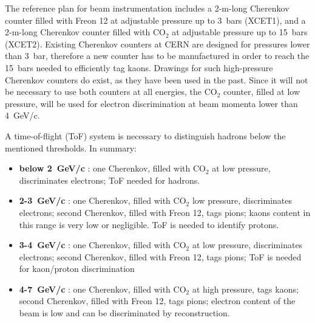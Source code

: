 The reference plan for beam instrumentation includes a 2-m-long
Cherenkov  counter filled with Freon 12 at adjustable pressure up to
3~bars (XCET1), and a  2-m-long  
 Cherenkov  counter filled with CO$_2$ at adjustable pressure up to
 15~bars (XCET2).
Existing Cherenkov counters at CERN are designed for pressures lower than  3~bar, therefore a new counter has to be manufactured in order to reach the 15~bars needed to efficiently tag kaons. Drawings for such high-pressure Cherenkov counters do exist, as they have been %
used in the past. 
Since it will not be necessary to use both counters at all energies, the CO$_2$
counter, filled at low pressure,  will be used for electron discrimination at beam momenta lower
than 4~GeV/c.  

A time-of-flight (ToF) system  is  necessary   to distinguish hadrons below the mentioned thresholds.
%
In summary:
\begin{itemize}
\item {\bf below 2~GeV/c} : one Cherenkov, filled with CO$_2$ at low
  pressure, discriminates electrons; ToF needed for hadrons.
\item {\bf 2-3~GeV/c} : one Cherenkov, filled with CO$_2$ low
  pressure, discriminates electrons; second Cherenkov, filled with
  Freon 12, tags pions; kaons content in this range is very low or negligible.
  ToF is needed to identify protons.
\item {\bf 3-4~GeV/c} : one Cherenkov, filled with CO$_2$ at low
  pressure, discriminates electrons; second  Cherenkov, filled with
  Freon 12, tags pions; ToF is needed for kaon/proton discrimination
\item {\bf 4-7~GeV/c} : one Cherenkov, filled with CO$_2$ at high
  pressure, tags kaons; second  Cherenkov, filled with
  Freon 12, tags pions; electron content of the beam is low and can be
  discriminated by reconstruction.
\end{itemize}

